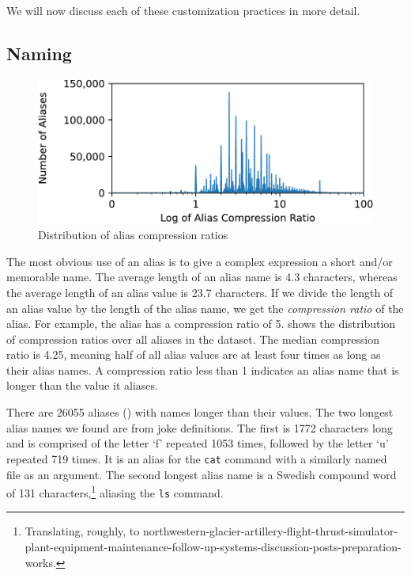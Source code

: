 We will now discuss each of these customization practices in more detail.


\subsection{Naming}

\begin{figure}
    \centering
    \includegraphics[width=0.95\columnwidth]{figures/compression.pdf}
    \caption{Distribution of alias compression ratios}
    \label{fig:compression}
\end{figure}

The most obvious use of an alias is to give a complex expression a short and/or memorable name.
The average length of an alias name is 4.3 characters, whereas the average length of an alias value is 23.7 characters.
If we divide the length of an alias value by the length of the alias name, we get the \emph{compression ratio} of the alias.
For example, the alias  has a compression ratio of 5.
 shows the distribution of compression ratios over all aliases in the dataset.
The median compression ratio is 4.25, meaning half of all alias values are at least four times as long as their alias names.
A compression ratio less than 1 indicates an alias name that is longer than the value it aliases.

There are \num{26055} aliases () with names longer than their values.
The two longest alias names we found are from joke definitions.
The first is \num{1772} characters long and is comprised of the letter `f' repeated \num{1053} times, followed by the letter `u' repeated 719 times.
It is an alias for the \verb|cat| command with a similarly named file as an argument.
The second longest alias name is a Swedish compound word of \num{131} characters,\footnote{Translating, roughly, to northwestern-glacier-artillery-flight-thrust-simulator-plant-equipment-maintenance-follow-up-systems-discussion-posts-preparation-works.} aliasing the \verb|ls| command.

